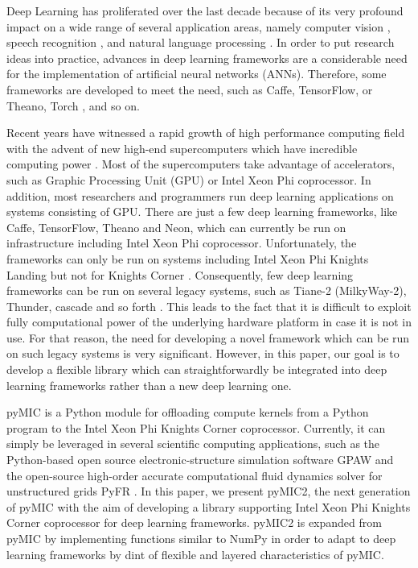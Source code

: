 Deep Learning has proliferated over the last decade because of its very profound impact on a wide range of several application areas, namely computer vision \cite{krizhevsky2012imagenet,russakovsky2015imagenet}, speech recognition \cite{ding2014theano,hannun2014deep}, and natural language processing \cite{collobert2011natural}. In order to put research ideas into practice, advances in deep learning frameworks are a considerable need for the implementation of artificial neural networks (ANNs). Therefore, some frameworks are developed to meet the need, such as Caffe\cite{caffe}, TensorFlow\cite{tensorflow}, or Theano\cite{theano}, Torch \cite{torch}, and so on. 

Recent years have witnessed a rapid growth of high performance computing field with the advent of new high-end supercomputers which have incredible computing power \cite{top500}. Most of the supercomputers take advantage of accelerators, such as Graphic Processing Unit (GPU) or Intel Xeon Phi coprocessor. In addition, most researchers and programmers run deep learning applications on systems consisting of GPU. There are just a few deep learning frameworks, like Caffe, TensorFlow, Theano and Neon, which can currently be run on infrastructure including Intel Xeon Phi coprocessor. Unfortunately, the frameworks can only be run on systems including Intel Xeon Phi Knights Landing but not for Knights Corner \cite{deep-frame-mic}. Consequently, few deep learning frameworks can be run on several legacy systems, such as Tiane-2 (MilkyWay-2), Thunder, cascade and so forth \cite{top500}. This leads to the fact that it is difficult to exploit fully computational power of the underlying hardware platform in case it is not in use. For that reason, the need for developing a novel framework which can be run on such legacy systems is very significant. However, in this paper, our goal is to develop a flexible library which can straightforwardly be integrated into deep learning frameworks rather than a new deep learning one.

pyMIC \cite{pymic,klemm2014pymic} is a Python module for offloading compute kernels from a Python program to the Intel Xeon Phi Knights Corner coprocessor. Currently, it can simply be leveraged in several scientific computing applications, such as the Python-based open source electronic-structure simulation software GPAW \cite{klemm2014pymic} and the open-source high-order accurate computational fluid dynamics solver for unstructured grids PyFR \cite{klemm2016using}. In this paper, we present pyMIC2, the next generation of pyMIC with the aim of developing a library supporting Intel Xeon Phi Knights Corner coprocessor for deep learning frameworks. pyMIC2 is expanded from pyMIC by implementing functions similar to NumPy \cite{Numpy} in order to adapt to deep learning frameworks by dint of flexible and layered characteristics of pyMIC. 

